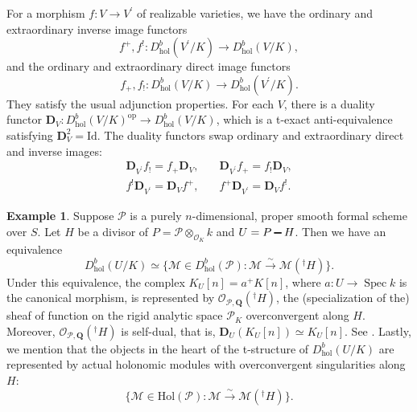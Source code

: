 \documentclass{amsart}
\numberwithin{equation}{section}
\theoremstyle{plain}
\theoremstyle{definition}
\newtheorem{example}[equation]{Example}
\renewcommand{\mathbb}{\mathbf}
\renewcommand{\setminus}{\mathbin{\rule[0.2em]{0.67em}{0.12em}}}%
\begin{document}
\medskip%
For a morphism \(f\colon V \to V^{\prime}\) of
realizable varieties, we have the ordinary and extraordinary inverse image
functors
\begin{equation*}
f^{+}, f^{!} \colon D^{b}_{\mathrm{hol}}(V^{\prime}/K) \to D^{b}_{\mathrm{hol}}(V/K),
\end{equation*}
and the ordinary and extraordinary direct image functors
\begin{equation*}
f_{+}, f_{!} \colon D^{b}_{\mathrm{hol}}(V/K) \to D^{b}_{\mathrm{hol}}(V^{\prime}/K).
\end{equation*}
They satisfy the usual adjunction properties.  For each \(V\), there
is a duality functor
\(\mathbb{D}_{V}\colon D^{b}_{\mathrm{hol}}(V/K)^{\mathrm{op}} \to
D^{b}_{\mathrm{hol}}(V/K)\), which is a t-exact anti-equivalence
satisfying \(\mathbb{D}_{V}^{2} = \mathrm{Id}\).  The duality functors
swap ordinary and extraordinary direct and inverse images:
\begin{align*}
\mathbb{D}_{V^{\prime}} f_{!} = f_{+}\mathbb{D}_{V}, \quad&
\mathbb{D}_{V^{\prime}} f_{+} = f_{!}\mathbb{D}_{V}, \\
f^{!}\mathbb{D}_{V^{\prime}} = \mathbb{D}_{V}f^{+}, \quad&
f^{+}\mathbb{D}_{V^{\prime}} = \mathbb{D}_{V}f^{!}.
\end{align*}

\begin{example}\label{example:structure-sheaf-of-an}
Suppose \(\mathcal{P}\) is a purely \(n\)-dimensional, proper smooth
formal scheme over \(S\).  Let \(H\) be a divisor of
\(P = \mathcal{P}\otimes_{\mathcal{O}_{K}}k\) and
\(U = P \setminus H\).  Then we have an equivalence
\begin{equation*}
D^{b}_{\mathrm{hol}}(U/K) \simeq \{\mathcal{M} \in D^{b}_{\mathrm{hol}}(\mathcal{P}) : \mathcal{M} \xrightarrow{\sim} \mathcal{M}({}^{\dagger}H)\}.
\end{equation*}
Under this equivalence, the complex \(K_{U}[n] = a^{+}K[n]\), where
\(a\colon U \to \operatorname{Spec}k\) is the canonical morphism, is
represented by
\(\mathcal{O}_{\mathcal{P},\mathbb{Q}}({}^{\dagger}H)\), the
(specialization of the) sheaf of function on the rigid analytic space
\(\mathcal{P}_{K}\) overconvergent along \(H\).  Moreover,
\(\mathcal{O}_{\mathcal{P},\mathbb{Q}}({}^{\dagger}H)\) is self-dual,
that is, \(\mathbb{D}_{U}(K_{U}[n]) \simeq K_{U}[n]\).  See
\cite[\S1.5.6]{abe:langlands-correspondence-for-isocrystals-and-crystalline-companions}.
Lastly, we mention that the objects in the heart of the t-structure of
\(D^{b}_{\mathrm{hol}}(U/K)\) are represented by actual holonomic
modules with overconvergent singularities along \(H\):
\begin{equation*}
\{ \mathcal{M} \in \mathrm{Hol}(\mathcal{P}) : \mathcal{M} \xrightarrow{\sim} \mathcal{M}({}^{\dagger}H)\}.
\end{equation*}
\end{example}
\end{document}
